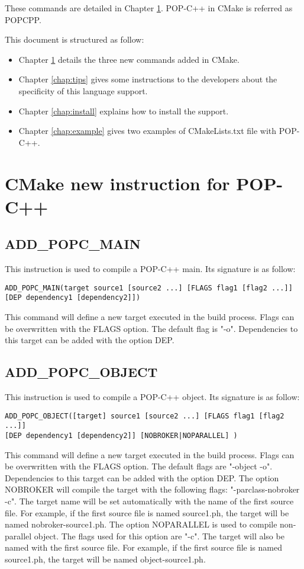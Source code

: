 \documentclass[a4paper, 11pt]{article}
\newcommand{\s}{\vspace{0.3cm}}
\begin{document}
These commands are detailed in  Chapter \ref{chap:instruction}. POP-C++ in CMake is referred as POPCPP.\s

This document is structured as follow: 
\begin{itemize}
\item Chapter \ref{chap:instruction} details the three new commands added in CMake. 
\item Chapter \ref{chap:tips} gives some instructions to the developers about the specificity of this language support.
\item Chapter \ref{chap:install} explains how to install the support.
\item Chapter \ref{chap:example} gives two examples of CMakeLists.txt file with POP-C++.
\end{itemize}


\section{CMake new instruction for POP-C++}
\label{chap:instruction}

\subsection{ADD\_POPC\_MAIN}	
This instruction is used to compile a POP-C++ main. Its signature is as follow:\s
\begin{lstlisting}
ADD_POPC_MAIN(target source1 [source2 ...] [FLAGS flag1 [flag2 ...]]
[DEP dependency1 [dependency2]])
\end{lstlisting}

This command will define a new target executed in the build process. Flags can be overwritten with the FLAGS option. The default flag is "-o". Dependencies to this target can be added with the option DEP. 


\subsection{ADD\_POPC\_OBJECT}
This instruction is used to compile a POP-C++ object. Its signature is as follow:\s
\begin{lstlisting}
ADD_POPC_OBJECT([target] source1 [source2 ...] [FLAGS flag1 [flag2 ...]]
[DEP dependency1 [dependency2]] [NOBROKER|NOPARALLEL] )
\end{lstlisting}\s

This command will define a new target executed in the build process. Flags can be overwritten with the FLAGS option. The default flags are "-object -o". Dependencies to this target can be added with the option DEP. The option NOBROKER will compile the target with the following flags: "-parclass-nobroker -c". The target name will be set automatically with the name of the first source file. For example, if the first source file is named source1.ph, the target will be named nobroker-source1.ph.
The option NOPARALLEL is used to compile non-parallel object. The flags used for this option are "-c". The target will also be named with the first source file. For example, if the first source file is named source1.ph, the target will be named object-source1.ph.
\end{document}
